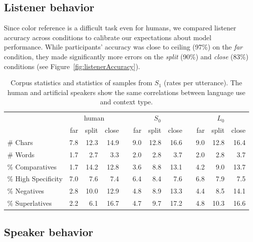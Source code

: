 \documentclass[11pt,letterpaper]{article}
\newcommand{\Listener}{L}
\newcommand{\Speaker}{S}
\renewcommand{\|}{\mid}
\newcommand{\figref}[1]{Figure~\ref{#1}}
\newcommand{\cond}{\emph}
\begin{document}
\subsection{Listener behavior}

Since color reference is a difficult task even for humans, we compared listener accuracy across conditions to calibrate our expectations about model performance. While participants' accuracy was close to ceiling (97\%) on the \cond{far} condition, they made significantly more errors on the \cond{split} (90\%) and \cond{close} (83\%) conditions (see \figref{fig:listenerAccuracy}).

\begin{table}[ht]
\centering
\begin{tabular}{lrrrr@{\hspace{20pt}}rrrr@{\hspace{20pt}}rrr}
  \toprule
  & \multicolumn{3}{c}{human}&& \multicolumn{3}{c}{$\Speaker_0$}&& \multicolumn{3}{c}{$\Listener_0$}\\
  & far& split& close&& far& split& close&& far& split& close\\ \midrule
  \# Chars            & 7.8 & 12.3 & 14.9 && 9.0 & 12.8 & 16.6 && 9.0 & 12.8 & 16.4 \\ 
  \# Words            & 1.7 & 2.7 & 3.3   && 2.0 & 2.8 & 3.7   && 2.0 & 2.8 & 3.7   \\ 
  \% Comparatives     & 1.7 & 14.2 & 12.8 && 3.6 & 8.8 & 13.1  && 4.2 & 9.0 & 13.7  \\ 
  \% High Specificity & 7.0 & 7.6 & 7.4   && 6.4 & 8.4 & 7.6   && 6.8 & 7.9 & 7.5   \\ 
  \% Negatives        & 2.8 & 10.0 & 12.9 && 4.8 & 8.9 & 13.3  && 4.4 & 8.5 & 14.1  \\ 
  \% Superlatives     & 2.2 & 6.1 & 16.7  && 4.7 & 9.7 & 17.2  && 4.8 & 10.3 & 16.6 \\ 
   \bottomrule
\end{tabular}
\caption{Corpus statistics and statistics of samples from $\Speaker_1$
  (rates per utterance). The human and artificial speakers show
  the same correlations between language use and context type.} 
\label{table:metrics}
\end{table}

\subsection{Speaker behavior} \label{sec:speaker_behavior}
\end{document}

